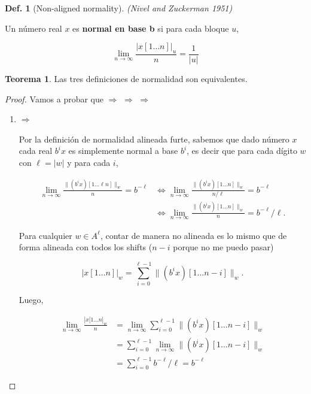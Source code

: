 \documentclass{report}
\theoremstyle{definition} %
\newtheorem{theorem}{Teorema}[chapter]
\newtheorem{definition}{Def.}[chapter]
\begin{document}
\begin{definition}[Non-aligned normality]\label{def:norm-non-aligned}
    \textit{(Nivel and Zuckerman 1951)}
    
    Un número real $x$ es \textbf{normal en base b} si para cada bloque $u$,

    $$\lim_{n\to\infty} \frac{|x[1\dots n]|_u}{n} = \frac{1}{|u|}$$
\end{definition}

\begin{theorem}
    Las tres definiciones de normalidad son equivalentes.
\end{theorem}

\begin{proof} Vamos a probar que
    $\Rightarrow$ 
    $\Rightarrow$ 
    $\Rightarrow$ 
\begin{enumerate}
    \item {} 
    $\Rightarrow$ 

    Por la definición de normalidad alineada furte, sabemos que dado número $x$
    cada real $b^i x$ es simplemente normal a base $b^i$, es decir que para cada
    dígito $w$ con $\ell = |w|$ y para cada $i$,
    
    \begin{align}
        \lim_{n\to \infty} \frac{\|(b^ix)[1\dots\ell n]\|_w}{n} = b^{-\ell}
        &\Leftrightarrow \lim_{n\to \infty} \frac{\|(b^ix)[1\dots n]\|_w}{n/\ell} = b^{-\ell} \nonumber \\
        &\Leftrightarrow \lim_{n\to \infty} \frac{\|(b^ix)[1\dots n]\|_w}{n} = b^{-\ell}/\ell. \label{teo:norm-eq-1}
    \end{align}

    Para cualquier $w \in A^\ell$, contar de manera no alineada es lo mismo que
    de forma alineada con todos los shifts ($n - i$ porque no me puedo pasar)
    
    $$|x[1\dots n]|_w = \sum_{i=0}^{\ell - 1} \|(b^ix)[1\dots n - i]\|_w.$$

    Luego,

    \begin{align*}
        \lim_{n\to \infty} \frac{|x[1\dots n|_w}{n}
            &= \lim_{n\to \infty}
                \sum_{i=0}^{\ell - 1} \|(b^ix)[1\dots n - i]\|_w \\
            &= \sum_{i=0}^{\ell - 1} 
                \lim_{n\to \infty} \|(b^ix)[1\dots n - i]\|_w \\
            &= \sum_{i=0}^{\ell - 1} 
                b^{-\ell}/\ell = b^{-\ell}
    \end{align*}


\end{enumerate}
\end{proof}
\end{document}
